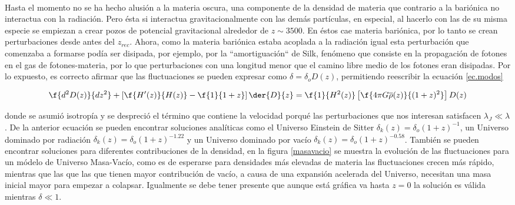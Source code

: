 \

Hasta el momento no se ha hecho alusión a la materia oscura, una componente
de la densidad de materia que contrario a la bariónica no interactua 
con la radiación. Pero ésta si interactua gravitacionalmente con las 
demás partículas, en especial, al hacerlo con las de su misma especie 
se empiezan a crear pozos de potencial gravitacional alrededor de $z\sim 3500$.
En éstos cae materia bariónica, por lo tanto se crean perturbaciones
desde antes del $z_{rec}$. Ahora, como la materia 
bariónica estaba acoplada a la radiación igual esta perturbación
que comenzaba a formarse podía ser disipada, por ejemplo, por 
la ``amortiguación`` de Silk, fenómeno que consiste en la propagación
de fotones en el gas de fotones-materia, por lo que perturbaciones
con una longitud menor que el camino libre medio de los fotones eran disipadas. 
Por lo expuesto, es correcto afirmar que las fluctuaciones se pueden 
expresar como $\delta = \delta_oD(z)$, permitiendo reescribir la ecuación \ref{ec.modos}

\[
\f{d^2D(z)}{dz^2}+\left[ \f{H'(z)}{H(z)} -\f{1}{1+z}\right]\der{D}{z}
= \f{1}{H^2(z)}\left[ \f{4\pi G\overline{\rho}(z)}{(1+z)^2} \right]D(z)
\]

donde se asumió isotropía y se despreció el término que contiene la velocidad
porqué las perturbaciones que nos interesan satisfacen $\lambda_J \ll \lambda$.
De la anterior ecuación se pueden encontrar soluciones analíticas como el Universo
Einstein de Sitter $\delta_k(z)=\delta_o(1+z)^{-1}$, un Universo dominado por 
radiación $\delta_k(z)=\delta_o(1+z)^{-1.22}$ y un Universo dominado por vacío
$\delta_k(z)=\delta_o(1+z)^{-0.58}$. También se pueden encontrar soluciones 
para diferentes contribuciones de la densidad, en la figura \ref{masavacio}
se muestra la evolución de las fluctuaciones para un módelo de Universo
Masa-Vacío, como es de esperarse para densidades más elevadas de materia las 
fluctuaciones crecen más rápido, mientras que las que las que tienen mayor contribución
de vacío, a causa de una expansión acelerada del Universo, necesitan una masa inicial mayor
para empezar a colapsar. Igualmente se debe tener presente que aunque está 
gráfica va hasta $z=0$ la solución es válida mientras $\delta\ll 1$. 


